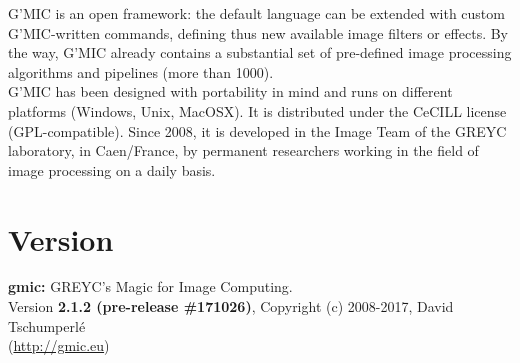 \documentclass[a4paper,10.5pt,twoside]{book}
\newcommand{\Ca}[1]{\textcolor{ca}{#1}}
\newcommand{\Cb}[1]{\textcolor{cb}{#1}}
\newcommand{\Cc}[1]{\textcolor{cc}{#1}}
\begin{document}
\Cc{G'MIC} is an open framework: the default language can be extended with custom \Cc{G'MIC}-written commands, defining thus new available image filters or effects. By the way, \Cc{G'MIC} already contains a substantial set of pre-defined image processing algorithms and pipelines (more than 1000).\\ 
 
\Cc{G'MIC} has been designed with portability in mind and runs on different platforms (Windows, Unix, MacOSX). It is distributed under the CeCILL license (GPL-compatible). Since 2008, it is developed in the Image Team of the GREYC laboratory, in Caen/France, by permanent researchers working in the field of image processing on a daily basis. 
\section*{Version} 
 
 \Ca{\textbf{gmic:} GREYC's Magic for Image Computing.}\\ 
 
        \Cb{Version \textbf{2.1.2 (pre-release \#171026)}, Copyright (c) 2008-2017, David Tschumperl\'e}\\ 
        \Cb{(\url{http://gmic.eu})} 
\end{document}
